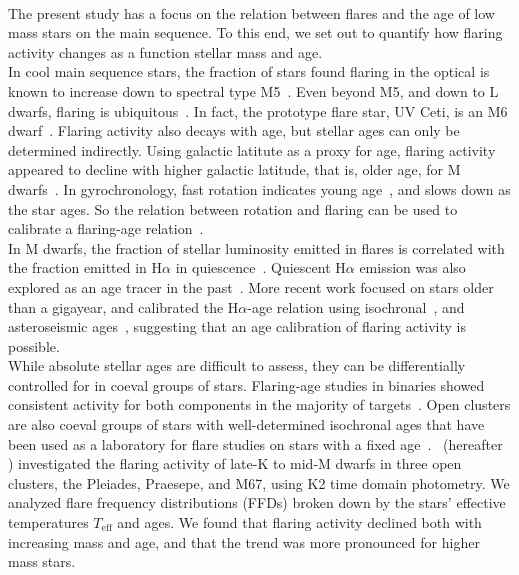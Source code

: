 \documentclass{aa}
\begin{document}
\\
The present study has a focus on the relation between flares and the age of low mass stars on the main sequence. To this end, we set out to quantify how flaring activity changes as a function stellar mass and age. 
\\
In cool main sequence stars, the fraction of stars found flaring in the optical is known to increase down to spectral type M5~\citep{yang_flaring_2017, chang2020}. Even beyond M5, and down to L dwarfs, flaring is ubiquitous~\citep{stelzer2006, robrade2010, gizis2013, schmidt2015, schmidt2016, paudel2018, paudel2020}. In fact, the prototype flare star, UV Ceti, is an M6 dwarf~\citep{kirkpatrick1991}. %
Flaring activity also decays with age, but stellar ages can only be determined indirectly. Using galactic latitute as a proxy for age, flaring activity appeared to decline with higher galactic latitude, that is, older age, for M dwarfs~\citep{hilton2010, walkowicz2011, howard2019}. In gyrochronology, fast rotation indicates young age~\citep{barnes_rotational_2003}, and slows down as the star ages. So the relation between rotation and flaring can be used to calibrate a flaring-age relation~\citep{davenport2019}. 
\\
In M dwarfs, the fraction of stellar luminosity emitted in flares is correlated with the fraction emitted in H$\alpha$ in quiescence~\citep{yang_flaring_2017}. Quiescent H$\alpha$ emission was also explored as an age tracer in the past~\citep{soderblom_chromospheric_1991, pace_chromospheric_2013, lorenzo-oliveira_age-mass-metallicity-activity_2016}. More recent work focused on stars older than a gigayear, and calibrated the H$\alpha$-age relation using isochronal~\citep{lorenzooliveira2018}, and asteroseismic ages~\citep{booth2017, booth2020}, suggesting that an age calibration of flaring activity is possible.%
\\
While absolute stellar ages are difficult to assess, they can be differentially controlled for in coeval groups of stars. Flaring-age studies in binaries showed consistent activity for both components in the majority of targets~\citep{lurie2015, clarke_flare_2018}. Open clusters are also coeval groups of stars with well-determined isochronal ages that have been used as a laboratory for flare studies on stars with a fixed age~\citep{mirzoyan1993, chang2015}. \citet{ilin2019}~(hereafter ) investigated the flaring activity of late-K to mid-M dwarfs in three open clusters, the Pleiades, Praesepe, and M67, using K2 time domain photometry. We analyzed flare frequency distributions (FFDs) broken down by the stars' effective temperatures $T_\mathrm{eff}$ and ages. We found that flaring activity declined both with increasing mass and age, and that the trend was more pronounced for higher mass stars. 
\end{document}
